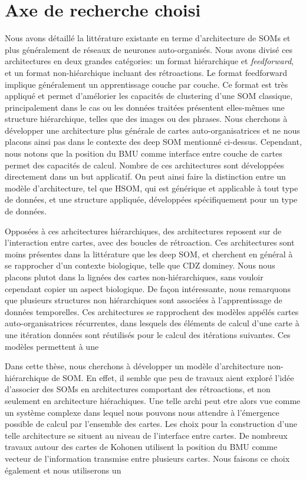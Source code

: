 \documentclass[../main]{subfiles}
\begin{document}
\section{Axe de recherche choisi}

Nous avons détaillé la littérature existante en terme d'architecture de SOMs et plus généralement de réseaux de neurones auto-organisés. Nous avons divisé ces architectures en deux grandes catégories: un format hiérarchique et \emph{feedforward}, et un format non-hiéarchique incluant des rétroactions.
Le format feedforward implique généralement un apprentissage couche par couche. Ce format est très appliqué et permet d'amélorier les capacités de clustering d'une SOM classique, principalement dans le cas ou les données traitées présentent elles-mêmes une structure hiérarchique, telles que des images ou des phrases.
Nous cherchons à développer une architecture plus générale de cartes auto-organisatrices et ne nous placons ainsi pas dans le contexte des deep SOM mentionné ci-dessus. 
Cependant, nous notons que la position du BMU comme interface entre couche de cartes permet des capacités de calcul.
Nombre de ces architectures sont développées directement dans un but applicatif. On peut ainsi faire la distinction entre un modèle d'architecture, tel que HSOM, qui est générique et applicable à tout type de données, et une structure appliquée, développées spécifiquement pour un type de données.

Opposées à ces arhcitectures hiérarchiques, des architectures reposent sur de l'interaction entre cartes, avec des boucles de rétroaction.
Ces architectures sont moins présentes dans la littérature que les deep SOM, et cherchent en général à se rapprocher d'un contexte biologique, telle que CDZ dominey.
Nous nous placons plutot dans la lignées des cartes non-hiérarchiques, sans vouloir cependant copier un aspect biologique.
De façon intéressante, nous remarquons que plusieurs structures non hiérarchiques sont associées à l'apprentissage de données temporelles. Ces architectures se rapprochent des modèles appélés cartes auto-organisatrices récurrentes, dans lesquels des éléments de calcul d'une carte à une itération données sont réutilisés pour le calcul des itérations suivantes. Ces modèles permettent à une 


Dans cette thèse, nous cherchons à développer un modèle d'architecture non-hiérarchique de SOM. En effet, il semble que peu de travaux aient exploré l'idée d'associer des SOMs en architectures comportant des rétroactions, et non seulement en architecture hiérachiques. 
Une telle archi peut etre alors vue comme un système complexe dans lequel nous pouvons nous attendre à l'émergence possible de calcul par l'ensemble des cartes.
Les choix pour la construction d'une telle architecture se situent au niveau de l'interface entre cartes. De nombreux travaux autour des cartes de Kohonen utilisent la position du BMU comme vecteur de l'information transmise entre plusieurs cartes. 
Nous faisons ce choix également et nous utiliserons un

\ifSubfilesClassLoaded{
    \bib
}{}
\end{document}
